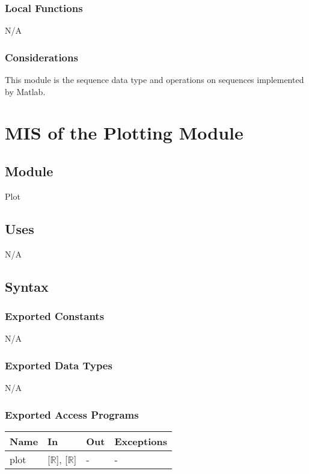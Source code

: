 \documentclass[12pt, titlepage]{article}
\begin{document}
\subsubsection{Local Functions}

N/A

\subsubsection{Considerations}
This module is the sequence data type and operations on sequences implemented 
by Matlab.


\section{MIS of the Plotting Module} \label{sec:Plotting}

\subsection{Module}
Plot

\subsection{Uses}

N/A

\subsection{Syntax}

\subsubsection{Exported Constants}
N/A

\subsubsection{Exported Data Types}

N/A

\subsubsection{Exported Access Programs}

\begin{center}
	\renewcommand*{\arraystretch}{1.5}
	\begin{tabular} {p{}  p{}  p{} 
			p{} } \hline 
		\textbf{Name} & \textbf{In} & \textbf{Out} & \textbf{Exceptions} \\ 
		\hline
		
		plot & [$\mathbb{R}$], [$\mathbb{R}$] & - & - \\ \hline
	\end{tabular}
\end{center}
\end{document}
